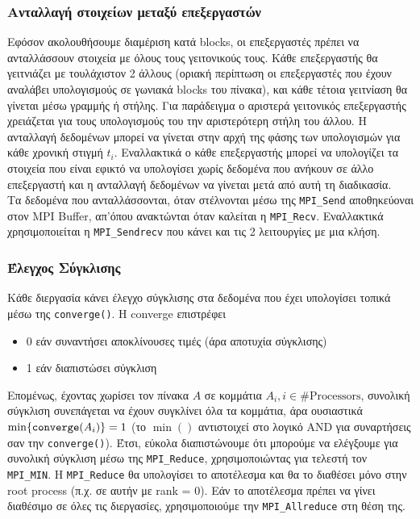 \documentclass[11pt,a4paper]{article}
\begin{document}
\subsubsection{Ανταλλαγή στοιχείων μεταξύ επεξεργαστών}
Εφόσον ακολουθήσουμε διαμέριση κατά blocks, οι επεξεργαστές πρέπει να ανταλλάσσουν στοιχεία με όλους τους γειτονικούς τους. Κάθε επεξεργαστής θα γειτνιάζει με τουλάχιστον 2 άλλους (οριακή περίπτωση οι επεξεργαστές που έχουν αναλάβει υπολογισμούς σε γωνιακά blocks του πίνακα), και κάθε τέτοια γειτνίαση θα γίνεται μέσω γραμμής ή στήλης. Για παράδειγμα ο αριστερά γειτονικός επεξεργαστής χρειάζεται για τους υπολογισμούς του την αριστερότερη στήλη του άλλου.
Η ανταλλαγή δεδομένων μπορεί να γίνεται στην αρχή της φάσης των υπολογισμών για κάθε χρονική στιγμή $t_i$. Εναλλακτικά ο κάθε επεξεργαστής μπορεί να υπολογίζει τα στοιχεία που είναι εφικτό να υπολογίσει χωρίς δεδομένα που ανήκουν σε άλλο επεξεργαστή και η ανταλλαγή δεδομένων να γίνεται μετά από αυτή τη διαδικασία. \\
Τα δεδομένα που ανταλλάσσονται, όταν στέλνονται μέσω της \texttt{MPI\_Send} αποθηκεύοναι στον MPI Buffer, απ'όπου ανακτώνται όταν καλείται η \texttt{MPI\_Recv}. Εναλλακτικά χρησιμοποιείται η \texttt{MPI\_Sendrecv} που κάνει και τις 2 λειτουργίες με μια κλήση.

\subsubsection{Έλεγχος Σύγκλισης}
Κάθε διεργασία κάνει έλεγχο σύγκλισης στα δεδομένα που έχει υπολογίσει τοπικά μέσω της \texttt{converge()}. Η converge επιστρέφει 
\begin{itemize}
	\item 0 εάν συναντήσει αποκλίνουσες τιμές (άρα αποτυχία σύγκλισης)
	\item 1 εάν διαπιστώσει σύγκλιση
\end{itemize}
Επομένως, έχοντας χωρίσει τον πίνακα $A$ σε κομμάτια $A_i, i \in \text{\#Processors} $, συνολική σύγκλιση συνεπάγεται να έχουν συγκλίνει όλα τα κομμάτια, άρα ουσιαστικά $ \min\{\text{\texttt{converge}}(A_i) \} = 1$ (το $\min()$ αντιστοιχεί στο λογικό AND για συναρτήσεις σαν την \texttt{converge()}). Έτσι, εύκολα διαπιστώνουμε ότι μπορούμε να ελέγξουμε για συνολική σύγκλιση μέσω της \texttt{MPI\_Reduce}, χρησιμοποιώντας για τελεστή τον \texttt{MPI\_MIN}. Η \texttt{MPI\_Reduce} θα υπολογίσει το αποτέλεσμα και θα το διαθέσει μόνο στην root process (π.χ. σε αυτήν με rank = 0).
Εάν το αποτέλεσμα πρέπει να γίνει διαθέσιμο σε όλες τις διεργασίες, χρησιμοποιούμε την \texttt{MPI\_Allreduce} στη θέση της.
\end{document}

